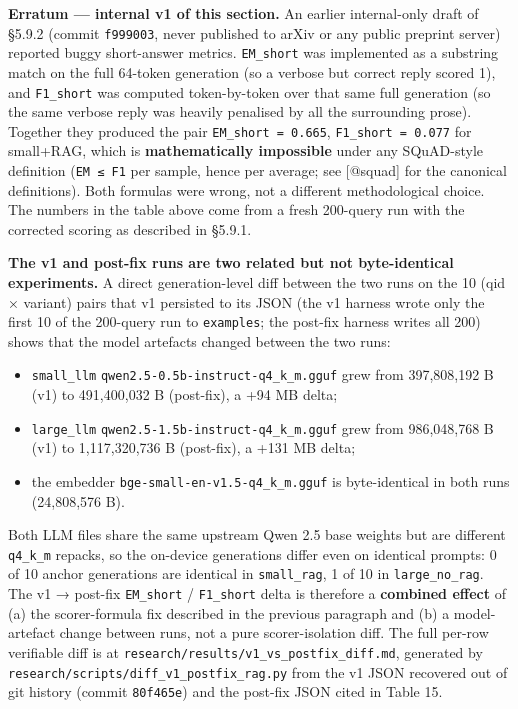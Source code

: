 \textbf{Erratum --- internal v1 of this section.} An earlier internal-only draft
of §5.9.2 (commit \texttt{f999003}, never published to arXiv or any public
preprint server) reported buggy short-answer metrics. \texttt{EM\_short} was
implemented as a substring match on the full 64-token generation (so a verbose
but correct reply scored 1), and \texttt{F1\_short} was computed token-by-token
over that same full generation (so the same verbose reply was heavily penalised
by all the surrounding prose). Together they produced the pair
\texttt{EM\_short\ =\ 0.665}, \texttt{F1\_short\ =\ 0.077} for small+RAG, which
is \textbf{mathematically impossible} under any SQuAD-style definition
(\texttt{EM\ ≤\ F1} per sample, hence per average; see {[}@squad{]} for the
canonical definitions). Both formulas were wrong, not a different methodological
choice. The numbers in the table above come from a fresh 200-query run with the
corrected scoring as described in §5.9.1.

\textbf{The v1 and post-fix runs are two related but not byte-identical
experiments.} A direct generation-level diff between the two runs on the 10 (qid
× variant) pairs that v1 persisted to its JSON (the v1 harness wrote only the
first 10 of the 200-query run to \texttt{examples}; the post-fix harness writes
all 200) shows that the model artefacts changed between the two runs:

\begin{itemize}
\tightlist
\item
  \texttt{small\_llm} \texttt{qwen2.5-0.5b-instruct-q4\_k\_m.gguf} grew from
  397,808,192 B (v1) to 491,400,032 B (post-fix), a +94 MB delta;
\item
  \texttt{large\_llm} \texttt{qwen2.5-1.5b-instruct-q4\_k\_m.gguf} grew from
  986,048,768 B (v1) to 1,117,320,736 B (post-fix), a +131 MB delta;
\item
  the embedder \texttt{bge-small-en-v1.5-q4\_k\_m.gguf} is byte-identical in
  both runs (24,808,576 B).
\end{itemize}

Both LLM files share the same upstream Qwen 2.5 base weights but are different
\texttt{q4\_k\_m} repacks, so the on-device generations differ even on identical
prompts: 0 of 10 anchor generations are identical in \texttt{small\_rag}, 1 of
10 in \texttt{large\_no\_rag}. The v1 → post-fix \texttt{EM\_short} /
\texttt{F1\_short} delta is therefore a \textbf{combined effect} of (a) the
scorer-formula fix described in the previous paragraph and (b) a model-artefact
change between runs, not a pure scorer-isolation diff. The full per-row
verifiable diff is at \texttt{research/results/v1\_vs\_postfix\_diff.md},
generated by \texttt{research/scripts/diff\_v1\_postfix\_rag.py} from the v1
JSON recovered out of git history (commit \texttt{80f465e}) and the post-fix
JSON cited in Table 15.

